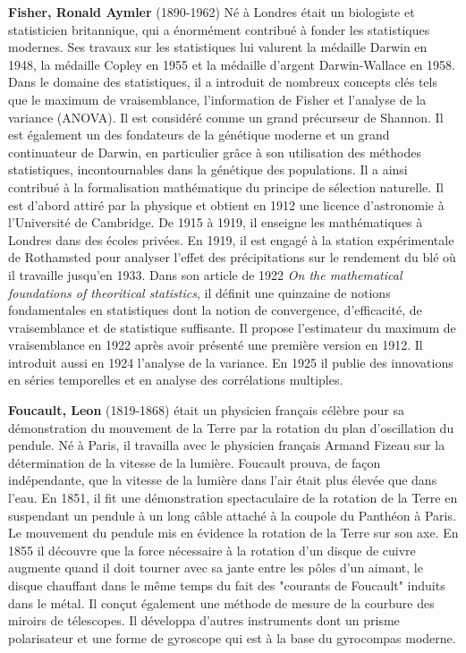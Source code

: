 \textbf{Fisher, Ronald Aymler} (1890-1962) Né à Londres était un biologiste et statisticien britannique, qui a énormément contribué à fonder les statistiques modernes. Ses travaux sur les statistiques lui valurent la médaille Darwin en 1948, la médaille Copley en 1955 et la médaille d'argent Darwin-Wallace en 1958. Dans le domaine des statistiques, il a introduit de nombreux concepts clés tels que le maximum de vraisemblance, l'information de Fisher et l'analyse de la variance (ANOVA). Il est considéré comme un grand précurseur de Shannon. Il est également un des fondateurs de la génétique moderne et un grand continuateur de Darwin, en particulier grâce à son utilisation des méthodes statistiques, incontournables dans la génétique des populations. Il a ainsi contribué à la formalisation mathématique du principe de sélection naturelle. Il est d'abord attiré par la physique et obtient en 1912 une licence d'astronomie à l'Université de Cambridge. De 1915 à 1919, il enseigne les mathématiques à Londres dans des écoles privées. En 1919, il est engagé à la station expérimentale de Rothamsted pour analyser l'effet des précipitations sur le rendement du blé où il travaille jusqu'en 1933. Dans son article de 1922 \textit{On the mathematical foundations of theoritical statistics}, il définit une quinzaine de notions fondamentales en statistiques dont la notion de convergence, d'efficacité, de vraisemblance et de statistique suffisante. Il propose l'estimateur du maximum de vraisemblance en 1922 après avoir présenté une première version en 1912. Il introduit aussi en 1924 l'analyse de la variance. En 1925 il publie des innovations en séries temporelles et en analyse des corrélations multiples.

\textbf{Foucault, Leon} (1819-1868) était un physicien français célèbre pour sa démonstration du mouvement de la Terre par la rotation du plan d'oscillation du pendule. Né à Paris, il travailla avec le physicien français Armand Fizeau sur la détermination de la vitesse de la lumière. Foucault prouva, de façon indépendante, que la vitesse de la lumière dans l'air était plus élevée que dans l'eau. En 1851, il fit une démonstration spectaculaire de la rotation de la Terre en suspendant un pendule à un long câble attaché à la coupole du Panthéon à Paris. Le mouvement du pendule mis en évidence la rotation de la Terre sur son axe. En 1855 il découvre que la force nécessaire à la rotation d'un disque de cuivre augmente quand il doit tourner avec sa jante entre les pôles d'un aimant, le disque chauffant dans le même temps du fait des "courants de Foucault" induits dans le métal. Il conçut également une méthode de mesure de la courbure des miroirs de télescopes. Il développa d'autres instruments dont un prisme polarisateur et une forme de gyroscope qui est à la base du gyrocompas moderne.

